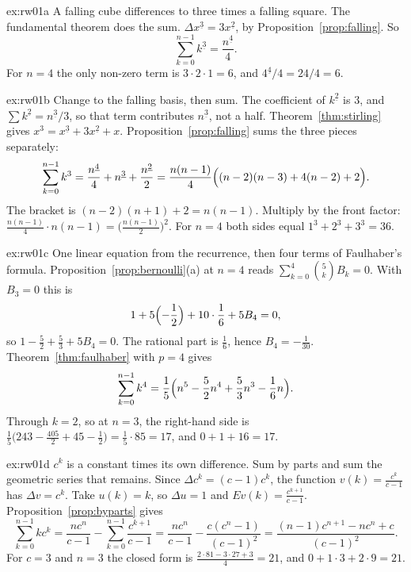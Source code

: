 \begin{solution}{ex:rw01a}
\idea A falling cube differences to three times a falling square. The fundamental theorem does the sum.
\writeup $\Delta x^{\underline 3}=3x^{\underline 2}$, by Proposition~\ref{prop:falling}. So
\[
\sum_{k=0}^{n-1}k^{\underline 3}=\frac{n^{\underline 4}}{4}.
\]
For $n=4$ the only non-zero term is $3\cdot2\cdot1=6$, and $4^{\underline 4}/4=24/4=6$.
\end{solution}

\begin{solution}{ex:rw01b}
\idea Change to the falling basis, then sum. The coefficient of $k^{\underline 2}$ is $3$, and $\sum k^{\underline 2}=n^{\underline 3}/3$, so that term contributes $n^{\underline 3}$, not a half.
\writeup Theorem~\ref{thm:stirling} gives $x^3=x^{\underline 3}+3x^{\underline 2}+x$. Proposition~\ref{prop:falling} sums the three pieces separately:
\[
\sum_{k=0}^{n-1}k^3=\frac{n^{\underline 4}}4+n^{\underline 3}+\frac{n^{\underline 2}}2=\frac{n(n-1)}4\Bigl((n-2)(n-3)+4(n-2)+2\Bigr).
\]
The bracket is $(n-2)(n+1)+2=n(n-1)$. Multiply by the front factor: $\frac{n(n-1)}{4}\cdot n(n-1)=\bigl(\frac{n(n-1)}2\bigr)^2$. For $n=4$ both sides equal $1^3+2^3+3^3=36$.
\end{solution}

\begin{solution}{ex:rw01c}
\idea One linear equation from the recurrence, then four terms of Faulhaber's formula.
\writeup Proposition~\ref{prop:bernoulli}(a) at $n=4$ reads $\sum_{k=0}^4\binom5k B_k=0$. With $B_3=0$ this is
\[
1+5\Bigl(-\frac12\Bigr)+10\cdot\frac16+5B_4=0,
\]
so $1-\frac52+\frac53+5B_4=0$. The rational part is $\frac16$, hence $B_4=-\frac1{30}$. Theorem~\ref{thm:faulhaber} with $p=4$ gives
\[
\sum_{k=0}^{n-1}k^4=\frac1{5}\Bigl(n^5-\frac52 n^4+\frac53 n^3-\frac16 n\Bigr).
\]
Through $k=2$, so at $n=3$, the right-hand side is $\frac15\bigl(243-\frac{405}2+45-\frac12\bigr)=\frac15\cdot85=17$, and $0+1+16=17$.
\end{solution}

\begin{solution}{ex:rw01d}
\idea $c^k$ is a constant times its own difference. Sum by parts and sum the geometric series that remains.
\writeup Since $\Delta c^k=(c-1)c^k$, the function $v(k)=\frac{c^k}{c-1}$ has $\Delta v=c^k$. Take $u(k)=k$, so $\Delta u=1$ and $Ev(k)=\frac{c^{k+1}}{c-1}$. Proposition~\ref{prop:byparts} gives
\[
\sum_{k=0}^{n-1}kc^k=\frac{nc^n}{c-1}-\sum_{k=0}^{n-1}\frac{c^{k+1}}{c-1}=\frac{nc^n}{c-1}-\frac{c(c^n-1)}{(c-1)^2}=\frac{(n-1)c^{n+1}-nc^n+c}{(c-1)^2}.
\]
For $c=3$ and $n=3$ the closed form is $\frac{2\cdot 81-3\cdot 27+3}{4}=21$, and $0+1\cdot3+2\cdot9=21$.
\end{solution}

